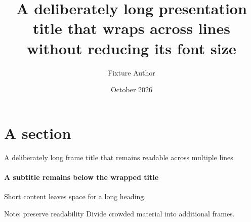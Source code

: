 \documentclass[11pt,aspectratio=43]{beamer}
\title[A short footer]{A deliberately long presentation title that wraps across lines without reducing its font size}
\author{Fixture Author}
\institute{An institute with a reasonably long descriptive name}
\date{October 2026}
\begin{document}
\begin{frame}[plain]\titlepage\end{frame}
\section{A section}
\begin{frame}{A deliberately long frame title that remains readable across multiple lines}
  \framesubtitle{A subtitle remains below the wrapped title}
  Short content leaves space for a long heading.
  \begin{block}{Note: preserve readability}
    Divide crowded material into additional frames.
  \end{block}
\end{frame}
\end{document}
